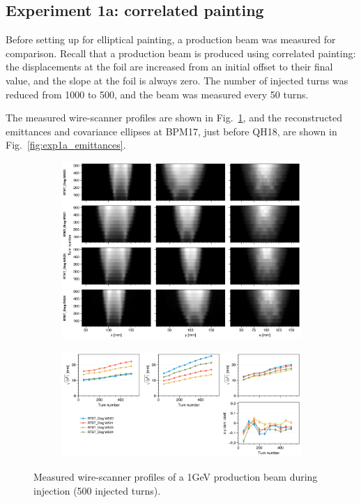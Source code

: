 \subsection{Experiment 1a: correlated painting}

Before setting up for elliptical painting, a production beam was measured for comparison. Recall that a production beam is produced using correlated painting: the displacements at the foil are increased from an initial offset to their final value, and the slope at the foil is always zero. The number of injected turns was reduced from 1000 to 500, and the beam was measured every 50 turns. 

The measured wire-scanner profiles are shown in Fig.~\ref{fig:exp1a_wsmeas}, and the reconstructed emittances and covariance ellipses at BPM17, just before QH18, are shown in Fig.~\ref{fig:exp1a_emittances}.
%
\begin{figure}[!p]
    \centering
    \begin{subfigure}{\textwidth}
        \includegraphics[width=\textwidth]{Images/chapter5/exp1a/waterfall.png}
    \end{subfigure}
    \vfill
    \vspace*{1.25cm}
    \vfill
    \begin{subfigure}{\textwidth}
        \includegraphics[width=\textwidth]{Images/chapter5/exp1a/rms.png}
    \end{subfigure}
    \caption{Measured wire-scanner profiles of a 1GeV production beam during injection (500 injected turns).}
    \label{fig:exp1a_wsmeas}
\end{figure}
